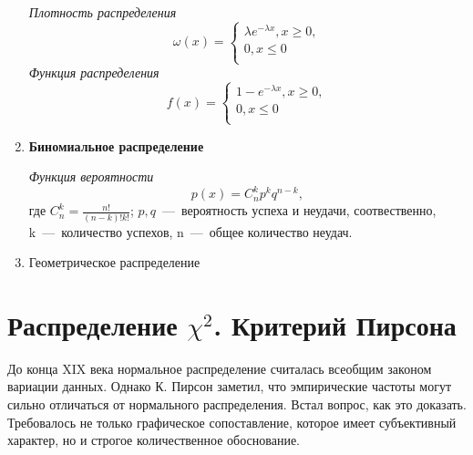 \documentclass[14pt,a4paper]{article}
\begin{document}
\begin{enumerate}
    \textit{Плотность распределения}
    \begin{equation}
        \omega(x) = \begin{cases}
            \lambda e^{-\lambda x}, x \geqslant 0, \\
            0, x \leqslant 0\\
        \end{cases}
    \end{equation}
    \textit{Функция распределения}
    \begin{equation}
        f(x) = \begin{cases}
            1 - e^{-\lambda x}, x \geqslant 0, \\
            0, x \leqslant 0\\
        \end{cases}
    \end{equation}
    \item \textbf{Биномиальное распределение}

    \textit{Функция вероятности}
    \begin{equation}
        p(x) = C^k_n p^kq^{n-k},
    \end{equation}
    где $C^k_n = \frac{n!}{(n-k)!k!}$; $p, q$~---~вероятность успеха и неудачи, соотвественно, k~---~количество успехов, n~---~общее количество неудач.

    \item Геометрическое распределение
\end{enumerate}
\section{Распределение $\chi^2$. Критерий Пирсона}
До конца XIX века нормальное распределение считалась всеобщим законом вариации данных. Однако К. Пирсон заметил, что эмпирические частоты могут сильно отличаться от нормального распределения. Встал вопрос, как это доказать. Требовалось не только графическое сопоставление, которое имеет субъективный характер, но и строгое количественное обоснование.
\end{document}
